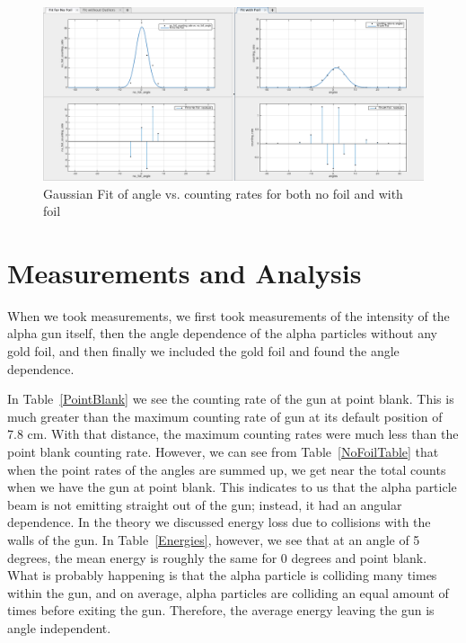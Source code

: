 \begin{figure}[t]
  \includegraphics[width=\textwidth]{CombinedGraphs.png}
  \begin{center}
  \caption{Gaussian Fit of angle vs. counting rates for both no foil and with foil}
  \label{Combined}
  \end{center}
\end{figure}

\section{Measurements and Analysis}


When we took measurements, we first took measurements of the intensity of the alpha gun itself, then the angle dependence of the alpha particles without any gold foil, and then finally we included the gold foil and found the angle dependence. 

In Table~\ref{PointBlank} we see the counting rate of the gun at point blank. This is much greater than the maximum counting rate of gun at its default position of 7.8 cm. With that distance, the maximum counting rates were much less than the point blank counting rate. However, we can see from Table~\ref{NoFoilTable} that when the point rates of the angles are summed up, we get near the total counts when we have the gun at point blank. This indicates to us that the alpha particle beam is not emitting straight out of the gun; instead, it had an angular dependence. In the theory we discussed energy loss due to collisions with the walls of the gun. In Table~\ref{Energies}, however, we see that at an angle of 5 degrees, the mean energy is roughly the same for 0 degrees and point blank. What is probably happening is that the alpha particle is colliding many times within the gun, and on average, alpha particles are colliding an equal amount of times before exiting the gun. Therefore, the average energy leaving the gun is angle independent. 


